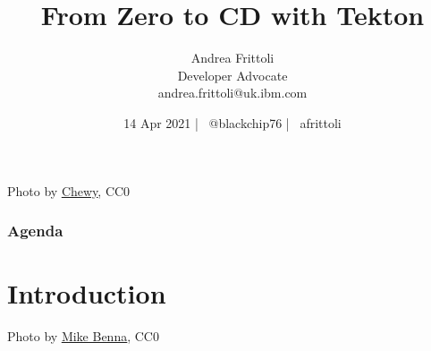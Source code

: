 \documentclass[aspectratio=169,11pt,hyperref={colorlinks=true}]{beamer}
\title{From Zero to CD with Tekton}
\date[14 Apr 2021]{14 Apr 2021 | \faTwitter ~@blackchip76 | \faGithub ~afrittoli}
\author[Andrea Frittoli]{%
  Andrea Frittoli \\
  Developer Advocate \\
  andrea.frittoli@uk.ibm.com \\
}
\begin{document}
\begin{frame}
\titlepage{}
\end{frame}

\begin{lpicrblack}{%
  Photo by \href{https://unsplash.com/@chewy}{\underline{Chewy}}, CC0
  }%
  {%
  \tableofcontents
  }%
  {}
  \frametitle{Agenda}
\end{lpicrblack}

\section[Introduction]{Introduction}

\begin{sectionwithpic}{Photo by \href{https://unsplash.com/@mbenna}{\underline{Mike Benna}}, CC0}
\end{sectionwithpic}
\end{document}
